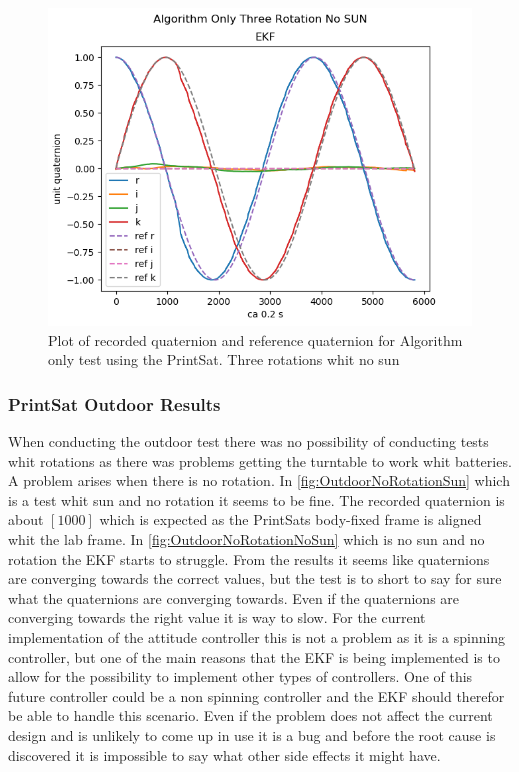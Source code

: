 \begin{figure}[tbp]
	\centering
	\includegraphics[width=1\columnwidth]{./Pictures/cdrRun3ThreeRotationsNoSun}
	\caption{Plot of recorded quaternion and reference quaternion for Algorithm only test using the PrintSat. Three rotations whit  no sun}
	\label{fig:cdr3RotNoSun}
\end{figure}

\subsubsection{PrintSat Outdoor Results}
When conducting the outdoor test there was no possibility of conducting tests whit rotations as there was problems getting the turntable to work whit batteries. A problem arises when there is no rotation. In \autoref{fig:OutdoorNoRotationSun} which is a test whit sun and no rotation it seems to be fine. The recorded quaternion is about $[1 0 0 0]$ which is expected as the PrintSats body-fixed frame is aligned whit the lab frame. In \autoref{fig:OutdoorNoRotationNoSun} which is no sun and no rotation the EKF starts to struggle. From the results it seems like quaternions are converging towards the correct values, but the test is to short to say for sure what the quaternions are converging towards. Even if the quaternions are converging towards the right value it is way to slow. For the current implementation of the attitude controller this is not a  problem as it is a spinning controller, but one of the main reasons that the EKF is being implemented is to allow for the possibility to implement other types of controllers. One of this future controller could be a non spinning controller and the EKF should therefor be able to handle this scenario. Even if the problem does not affect the current design and is unlikely to come up in use it is a bug and before the root cause is discovered it is impossible to say what other side effects it might have.

